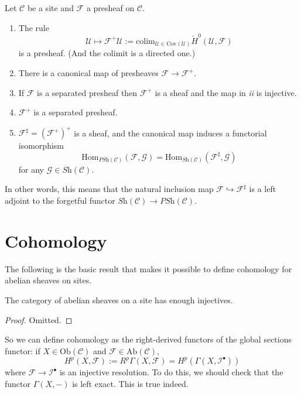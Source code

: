 \begin{theorem}
\label{theorem-sheafification}
Let $\mathcal{C}$ be a site and $\mathcal{F}$ a presheaf on $\mathcal{C}$.
\begin{enumerate}
\item The rule
$$
\mathcal{U} \mapsto \mathcal{F}^+ \mathcal{U} := \text{colim}_{\mathcal{U} \in
\text{Cov}(\mathcal{U})} \check H^0(\mathcal{U}, \mathcal{F})
$$
is a presheaf. (And the colimit is a directed one.)
\item There is a canonical map of presheaves $\mathcal{F} \to \mathcal{F}^+$.
\item If $\mathcal{F}$ is a separated presheaf then $\mathcal{F}^+$ is a sheaf
and the map in {\it ii} is injective.
\item $\mathcal{F}^+$ is a separated presheaf.
\item $\mathcal{F}^\sharp = (\mathcal{F}^+)^+$ is a sheaf, and the canonical
map induces a functorial isomorphism
$$
\text{Hom}_{\textit{PSh}(\mathcal{C})}(\mathcal{F}, \mathcal{G}) =
\text{Hom}_{\textit{Sh}(\mathcal{C})}(\mathcal{F}^\sharp,\mathcal{G})
$$
for any $\mathcal{G} \in \textit{Sh}(\mathcal{C})$.
\end{enumerate}
\end{theorem}

\noindent
In other words, this means that the natural inclusion map $\mathcal{F}
\hookrightarrow \mathcal{F}^\sharp$ is a left adjoint to the forgetful functor
$\textit{Sh}(\mathcal{C}) \to \textit{PSh}(\mathcal{C})$.




\section{Cohomology}
\label{section-cohomology}

\noindent
The following is the basic result that makes it possible to define cohomology
for abelian sheaves on sites.

\begin{theorem}
\label{theorem-enough-injectives}
The category of abelian sheaves on a site has enough injectives.
\end{theorem}

\begin{proof}
Omitted.
\end{proof}

\noindent
So we can define cohomology as the right-derived functors of the global
sections functor: if $X \in \text{Ob}(\mathcal{C})$ and $\mathcal{F} \in
\text{Ab}(\mathcal{C})$,
$$
H^p(X,\mathcal{F}) := R^p \Gamma (X, \mathcal{F}) = H^p (\Gamma(X,
\mathcal{I}^\bullet))
$$
where $\mathcal{F} \to \mathcal{I}^\bullet$ is an injective resolution. To do
this, we should check that the functor $\Gamma (X, -)$ is left exact. This is
true indeed.




